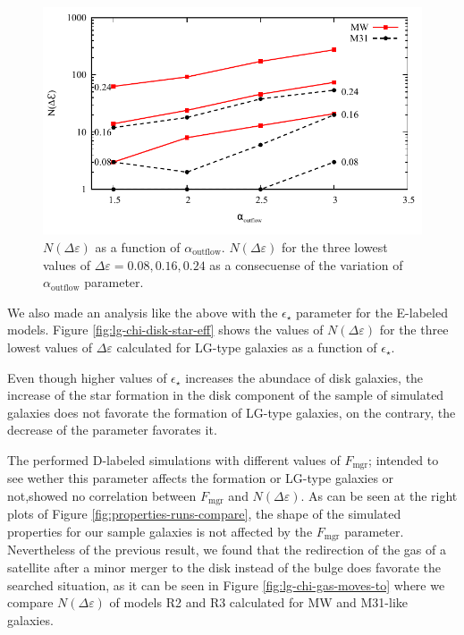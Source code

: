 \documentclass[usenatbib]{mn2e}
\begin{document}
\begin{figure}
\centering
 \includegraphics[scale=0.68]{figures/chi-parameters/chi-squared-disk-outflow-exp-v2.pdf}
\caption{$N(\Delta\varepsilon)$ as a function of
  $\alpha_{\text{outflow}}$. $N(\Delta\varepsilon)$ for the three
  lowest values of $\Delta\varepsilon=0.08,0.16,0.24$ as a consecuense
  of the variation of $\alpha_{\text{outflow}}$
  parameter. \label{fig:lg-chi-disk-outflow}} 
\end{figure}

We also made an analysis like the above with the $\epsilon_{\star}$
parameter for the E-labeled models. Figure
\ref{fig:lg-chi-disk-star-eff} shows the values of
$N(\Delta\varepsilon)$ for the three lowest values of
$\Delta\varepsilon$ calculated for LG-type galaxies as a function of
$\epsilon_{\star}$.  
  
Even though higher values of  $\epsilon_{\star}$ increases the
abundace of disk galaxies, the increase  of the star  formation in the
disk component of the sample of simulated galaxies does not favorate
the formation of LG-type  galaxies, on the contrary, the decrease of
the parameter favorates it. 

The performed D-labeled simulations with different values of
$F_{\text{mgr}}$; intended to see wether this parameter affects the
formation or LG-type galaxies or not,showed no correlation between
$F_{\text{mgr}}$ and $N(\Delta\varepsilon)$. As can be seen at the
right plots of Figure \ref{fig:properties-runs-compare}, the shape of
the simulated properties for our sample galaxies is not affected by
the $F_{\text{mgr}}$ parameter. Nevertheless of the previous result,
we found that the redirection of the gas of a satellite after  a minor
merger to the disk instead of the bulge does favorate the searched
situation, as it can be seen in Figure \ref{fig:lg-chi-gas-moves-to}
where we compare $N(\Delta\varepsilon)$ of models R2 and R3 calculated
for MW and M31-like galaxies. 
\end{document}
